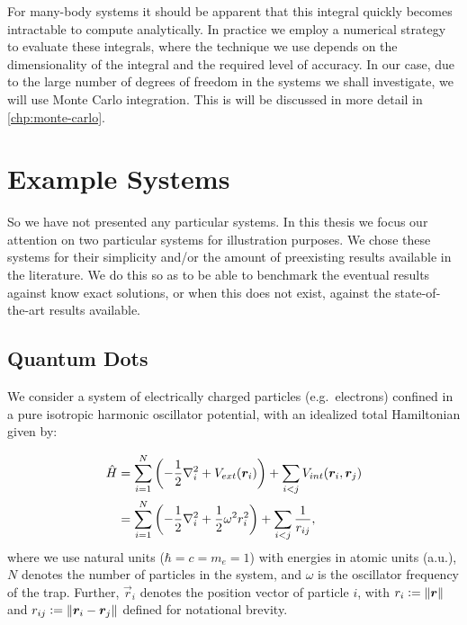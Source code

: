 \documentclass[Thesis.tex]{subfiles}
\begin{document}
For many-body systems it should be apparent that this integral quickly becomes intractable
to compute analytically. In practice we employ a numerical strategy to evaluate these
integrals, where the technique we use depends on the dimensionality of the integral and
the required level of accuracy. In our case, due to the large number
of degrees of freedom in the systems we shall investigate, we will use Monte
Carlo integration. This is will be discussed in more detail in \cref{chp:monte-carlo}.

\section{Example Systems}

So we have not presented any particular systems. In this thesis we focus our
attention on two particular systems for illustration purposes. We chose these systems
for their simplicity and/or the amount of preexisting results available
in the literature. We do this so as to be able to benchmark the eventual results against
know exact solutions, or when this does not exist, against the state-of-the-art results
available.

\subsection{Quantum Dots}
\label{sec:quantum-dots-theory}

We consider a system of electrically charged particles (e.g.\ electrons) confined in a pure
isotropic harmonic oscillator potential, with an idealized total Hamiltonian
given by:

\begin{align}
    \begin{split}
        \hat H &= \sum_{i=1}^N\qty(-\frac{1}{2}\laplacian_i + V_{ext}(\vec r_i)) +
        \sum_{i < j} V_{int}(\vec r_i, \vec r_j)\\
        &= \sum_{i=1}^N\qty(-\frac{1}{2}\laplacian_i + \frac{1}{2}\omega^2
        r_i^2) + \sum_{i < j} \frac{1}{r_{ij}},
    \end{split}\label{eq:H-QD-def}
\end{align}
where we use natural units ($\hbar=c=m_e=1$) with energies in
atomic units (a.u.), $N$ denotes the number of particles in the system, and
$\omega$ is the oscillator frequency of the trap. Further, $\vec r_i$
denotes the position vector of particle $i$, with $r_i \vcentcolon= \norm{\bm{r}}$ and
$r_{ij}\vcentcolon= \norm{\bm{r}_i - \bm{r}_j}$ defined for notational brevity.
\end{document}
